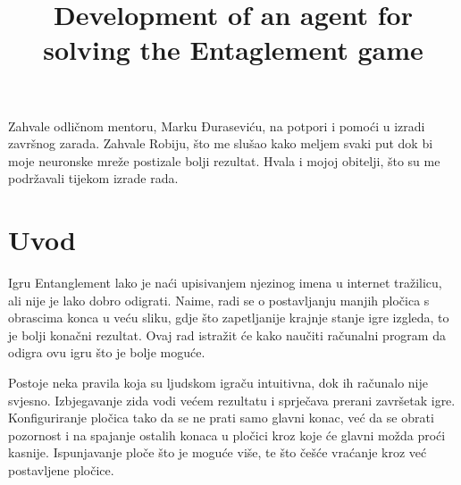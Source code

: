 \documentclass[zavrsnirad]{fer}
\title{Development of an agent for solving the Entaglement game}
\begin{document}






\begin{zahvale}
  Zahvale odličnom mentoru, Marku Đuraseviću, na potpori i pomoći u izradi završnog zarada. Zahvale Robiju, što me slušao kako meljem svaki put dok bi moje neuronske mreže postizale bolji rezultat. Hvala i mojoj obitelji, što su me podržavali tijekom izrade rada. 
\end{zahvale}


\mainmatter


\tableofcontents


\chapter{Uvod}
\label{pog:uvod}



Igru Entanglement lako je naći upisivanjem njezinog imena u internet tražilicu, ali nije je lako dobro odigrati. Naime, radi se o postavljanju manjih pločica s obrascima konca u veću sliku, gdje što zapetljanije krajnje stanje igre izgleda, to je bolji konačni rezultat. Ovaj rad istražit će kako naučiti računalni program da odigra ovu igru što je bolje moguće.

Postoje neka pravila koja su ljudskom igraču intuitivna, dok ih računalo nije svjesno. Izbjegavanje zida vodi većem rezultatu i sprječava prerani završetak igre. Konfiguriranje pločica tako da se ne prati samo glavni konac, već da se obrati pozornost i na spajanje ostalih konaca u pločici kroz koje će glavni možda proći kasnije. Ispunjavanje ploče što je moguće više, te što češće vraćanje kroz već postavljene pločice. 
\end{document}
